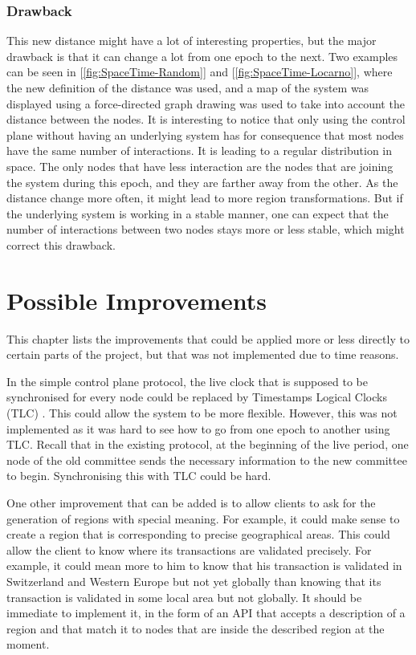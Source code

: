 \documentclass[a4paper,11pt,twoside=semi,openright]{report}
\begin{document}
\subsection{Drawback}
This new distance might have a lot of interesting properties, but the major
drawback is that it can change a lot from one epoch to the next. Two examples
can be seen in [\autoref{fig:SpaceTime-Random}] and
[\autoref{fig:SpaceTime-Locarno}], where the new definition of the distance was
used, and a map of the system was displayed using a force-directed graph
drawing was used to take into account the distance between the nodes. It is
interesting to notice that only using the control plane without having an
underlying system has for consequence that most nodes have the same number of
interactions. It is leading to a regular distribution in space. The only nodes
that have less interaction are the nodes that are joining the system during
this epoch, and they are farther away from the other. As the distance change
more often, it might lead to more region transformations. But if the underlying
system is working in a stable manner, one can expect that the number of
interactions between two nodes stays more or less stable, which might correct
this drawback.


\chapter{Possible Improvements} \label{chap:Possible Improvements} %

This chapter lists the improvements that could be applied more or less directly
to certain parts of the project, but that was not implemented due to time reasons. 

In the simple control plane protocol, the live clock that is supposed to be
synchronised for every node could be replaced by Timestamps Logical Clocks (TLC)
\cite{Ford2019}. This could allow the system to be more flexible.
However, this was not implemented as it was hard to see how to go from one
epoch to another using TLC. Recall that in the existing protocol, at the
beginning of the live period, one node of the old committee sends the necessary
information to the new committee to begin. Synchronising this with TLC could be hard.

One other improvement that can be added is to allow clients to ask for the
generation of regions with special meaning. For example, it could make sense to
create a region that is corresponding to precise geographical areas. This could
allow the client to know where its transactions are validated precisely. For
example, it could mean more to him to know that his transaction is validated in
Switzerland and Western Europe but not yet globally than knowing that its transaction
is validated in some local area but not globally. It should be immediate to
implement it, in the form of an API that accepts a description of a region and
that match it to nodes that are inside the described region at the moment. 
\end{document}
